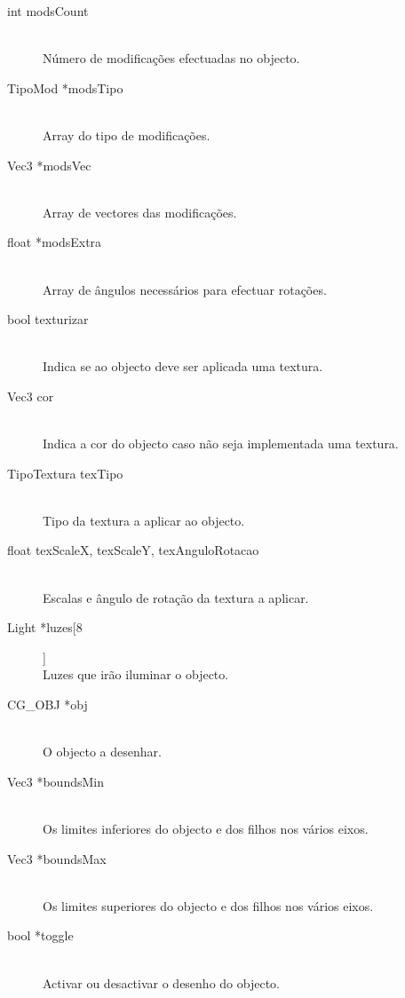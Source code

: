 \documentclass[a5paper,onecolumn, 11pt]{article}
\begin{document}
\begin{description}
	\item[int modsCount] \hfill \\
	Número de modificações efectuadas no objecto.

	\item[TipoMod *modsTipo] \hfill \\
	Array do tipo de modificações.

	\item[Vec3 *modsVec] \hfill \\
	Array de vectores das modificações.

	\item[float *modsExtra] \hfill \\
	Array de ângulos necessários para efectuar rotações.

	\item[bool texturizar] \hfill \\
	Indica se ao objecto deve ser aplicada uma textura.

	\item[Vec3 cor] \hfill \\
	Indica a cor do objecto caso não seja implementada uma textura.

	\item[TipoTextura texTipo] \hfill \\
	Tipo da textura a aplicar ao objecto.

	\item[float texScaleX, texScaleY, texAnguloRotacao] \hfill \\
	Escalas e ângulo de rotação da textura a aplicar.

	\item[Light *luzes[8]] \hfill \\
	Luzes que irão iluminar o objecto.

	\item[CG\_OBJ *obj] \hfill \\
	O objecto a desenhar.

	\item[Vec3 *boundsMin] \hfill \\
	Os limites inferiores do objecto e dos filhos nos vários eixos.

	\item[Vec3 *boundsMax] \hfill \\
	Os limites superiores do objecto e dos filhos nos vários eixos.
	
	\item[bool *toggle] \hfill \\
	Activar ou desactivar o desenho do objecto.


\end{description}
\end{document}
